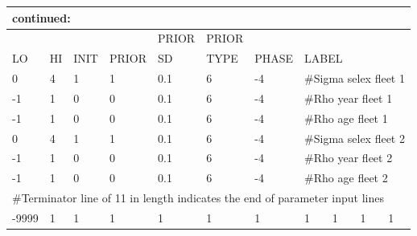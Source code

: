 \begin{longtable}{p{1cm} p{1cm} p{1cm} p{1.25cm} p{1.25cm} p{1.25cm} p{1.2cm} p{1.2cm} p{1cm} p{1cm} p{1cm}}
	\multicolumn{11}{l}{continued:} \\
	\hline
	     &    &      &       & PRIOR & PRIOR &       &     & & & \Tstrut\\
	LO & HI & INIT & PRIOR & SD    & TYPE  & PHASE & \multicolumn{4}{l}{LABEL}\Bstrut\\
	\hline
	 0 & 4 & 1 & 1 & 0.1 & 6 & -4 & \multicolumn{4}{l}{\#Sigma selex fleet 1}\Tstrut\\
	-1 & 1 & 0 & 0 & 0.1 & 6 & -4 & \multicolumn{4}{l}{\#Rho year fleet 1}\\
	-1 & 1 & 0 & 0 & 0.1 & 6 & -4 & \multicolumn{4}{l}{\#Rho age fleet 1}\\
	 0 & 4 & 1 & 1 & 0.1 & 6 & -4 & \multicolumn{4}{l}{\#Sigma selex fleet 2}\\
	-1 & 1 & 0 & 0 & 0.1 & 6 & -4 & \multicolumn{4}{l}{\#Rho year fleet 2}\\
	-1 & 1 & 0 & 0 & 0.1 & 6 & -4 & \multicolumn{4}{l}{\#Rho age fleet 2}\Bstrut\\
	\multicolumn{11}{l}{\#Terminator line of 11 in length indicates the end of parameter input lines}\\
	-9999 & 1 & 1 & 1 & 1 & 1 & 1 & 1 & 1 & 1 & 1 \\
	\hline
\end{longtable}


